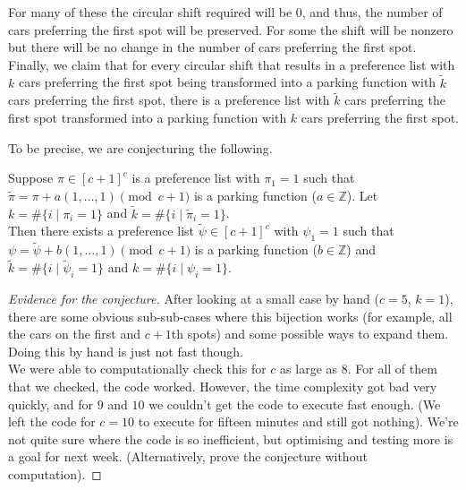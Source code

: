 For many of these the circular shift required will be $0$, and thus, the number of cars preferring the first spot will be preserved. For some the shift will be nonzero but there will be no change in the number of cars preferring the first spot. Finally, we claim that for every circular shift that results in a preference list with $k$ cars preferring the first spot being transformed into a parking function with $\tilde{k}$ cars preferring the first spot, there is a preference list with $\tilde{k}$ cars preferring the first spot transformed into a parking function with $k$ cars preferring the first spot.

To be precise, we are conjecturing the following.

\begin{conjecture} \label{cnj: counting-ones}
	Suppose $\pi \in [c + 1]^{c}$ is a preference list with $\pi_{1} = 1$ such that $\tilde{\pi} = \pi + a (1, \dots, 1) \pmod{c + 1}$ is a parking function ($a \in \mathbb{Z}$). Let $k = \#\{ i \mid \pi_{i} = 1 \}$ and $\tilde{k} = \#\{ i \mid \tilde{\pi}_{i} = 1 \}$. \\

	Then there exists a preference list $\tilde{\psi} \in [c + 1]^{c}$ with $\psi_{1} = 1$ such that $\psi = \tilde{\psi} + b (1, \dots, 1) \pmod{c + 1}$ is a parking function ($b \in \mathbb{Z}$) and $\tilde{k} = \#\{ i \mid \tilde{\psi}_{i} = 1 \}$ and $k = \# \{ i \mid \psi_{i} = 1 \}$.
\end{conjecture}

\begin{proof}[Evidence for the conjecture]
	After looking at a small case by hand ($c = 5$, $k = 1$), there are some obvious sub-sub-cases where this bijection works (for example, all the cars on the first and $c + 1$th spots) and some possible ways to expand them. Doing this by hand is just not fast though. \\
	
	We were able to computationally check this for $c$ as large as $8$. For all of them that we checked, the code worked. However, the time complexity got bad very quickly, and for $9$ and $10$ we couldn't get the code to execute fast enough. (We left the code for $c = 10$ to execute for fifteen minutes and still got nothing). We're not quite sure where the code is so inefficient, but optimising and testing more is a goal for next week. (Alternatively, prove the conjecture without computation).
\end{proof}

